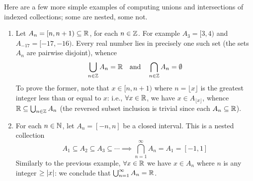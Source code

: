  
\begin{examples}{}{}
	Here are a few more simple examples of computing unions and intersections of indexed collections; some are nested, some not.
	\begin{enumerate}
		\item\label{ex:index2} Let $A_n=[n,n+1)\subseteq\mathbb{R}$, for each $n\in\mathbb{Z}$. For example $A_3=[3,4)$ and $A_{-17}=[-17,-16)$. Every real number lies in precisely one such set (the sets $A_n$ are pairwise disjoint), whence
		\[
			\bigcup\limits_{n\in\mathbb{Z}}A_n=\mathbb{R}\quad\text{and}\quad\bigcap\limits_{n\in\mathbb{Z}}A_n=\emptyset
		\]
		To prove the former, note that $x\in[n,n+1)$ where $n=\lfloor x\rfloor$ is the greatest integer less than or equal to $x$: i.e., $\forall x\in\mathbb{R}$, we have $x\in A_{\lfloor x\rfloor}$, whence $\mathbb{R}\subseteq\bigcup_{n\in\mathbb{Z}} A_n$ (the reversed subset inclusion is trivial since each $A_n\subseteq \mathbb{R}$).

		\item For each $n\in\mathbb{N}$, let $A_n=[-n,n]$ be a closed interval. This is a nested collection
		\[
			A_1\subseteq A_2\subseteq A_3\subseteq\cdots \implies {\bigcap_{n=1}^\infty} A_n=A_1=[-1,1]
		\]
		Similarly to the previous example, $\forall x\in\mathbb{R}$ we have $x\in A_n$ where $n$ is any integer $\ge\left| x\right|$: we conclude that $\bigcup_{n=1}^\infty A_n=\mathbb{R}$. 


\end{enumerate}
\end{examples}
